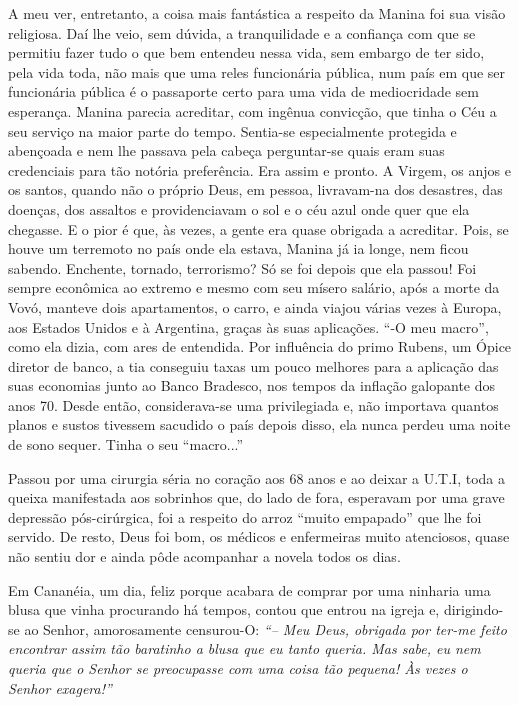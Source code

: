 A meu ver, entretanto, a coisa mais fantástica a respeito da Manina foi sua visão religiosa.
Daí lhe veio, sem dúvida, a tranquilidade e a confiança com que se permitiu fazer tudo o que bem entendeu nessa vida, sem embargo de ter sido, pela vida toda, não mais que uma reles funcionária pública, num país em que ser funcionária pública é o passaporte certo para uma vida de mediocridade sem esperança.
Manina parecia acreditar, com ingênua convicção, que tinha o Céu a seu serviço na maior parte do tempo.
Sentia-se especialmente protegida e abençoada e nem lhe passava pela cabeça perguntar-se quais eram suas credenciais para tão notória preferência.
Era assim e pronto.
A Virgem, os anjos e os santos, quando não o próprio Deus, em pessoa, livravam-na dos desastres, das doenças, dos assaltos e providenciavam o sol e o céu azul onde quer que ela chegasse.
E o pior é que, às vezes, a gente era quase obrigada a acreditar.
Pois, se houve um terremoto no país onde ela estava, Manina já ia longe, nem ficou sabendo.
Enchente, tornado, terrorismo? Só se foi depois que ela passou! Foi sempre econômica ao extremo e mesmo com seu mísero salário, após a morte da Vovó, manteve dois apartamentos, o carro, e ainda viajou várias vezes à Europa, aos Estados Unidos e à Argentina, graças às suas aplicações.
``-O meu macro'', como ela dizia, com ares de entendida.
Por influência do primo Rubens, um Ópice diretor de banco, a tia conseguiu taxas um pouco melhores para a aplicação das suas economias junto ao Banco Bradesco, nos tempos da inflação galopante dos anos 70.
Desde então, considerava-se uma privilegiada e, não importava quantos planos e sustos tivessem sacudido o país depois disso, ela nunca perdeu uma noite de sono sequer.
Tinha o seu ``macro...''

Passou por uma cirurgia séria no coração aos 68 anos e ao deixar a U.T.I, toda a queixa manifestada aos sobrinhos que, do lado de fora, esperavam por uma grave depressão pós-cirúrgica, foi a respeito do arroz ``muito empapado'' que lhe foi servido.
De resto, Deus foi bom, os médicos e enfermeiras muito atenciosos, quase não sentiu dor e ainda pôde acompanhar a novela todos os dias.

Em Cananéia, um dia, feliz porque acabara de comprar por uma ninharia uma blusa que vinha procurando há tempos, contou que entrou na igreja e, dirigindo-se ao Senhor, amorosamente censurou-O: 
{\itshape``-- Meu Deus, obrigada por ter-me feito encontrar assim tão baratinho a blusa que eu tanto queria.
Mas sabe, eu nem queria que o Senhor se preocupasse com uma coisa tão pequena! Às vezes o Senhor exagera!''}

